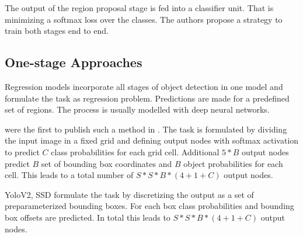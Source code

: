 	The output of the region proposal stage is fed into a classifier unit. That is minimizing a softmax loss over the classes. The authors propose a strategy to train both stages end to end.

	\subsection{One-stage Approaches}
	

	Regression models incorporate all stages of object detection in one model and formulate the task as regression problem. Predictions are made for a predefined set of regions. The process is usually modelled with deep neural networks.
	
	\citeauthor{Redmon} were the first to publish such a method in \cite{Redmon}. The task is formulated by dividing the input image in a fixed grid and defining output nodes with softmax activation to predict $C$ class probabilities for each grid cell. Additional $5*B$ output nodes predict $B$ set of bounding box coordinates and $B$ object probabilities for each cell. This leads to a total number of $S*S*B*(4 + 1 + C)$ output nodes. 
	
	YoloV2, SSD  formulate the task by discretizing the output as a set of preparameterized bounding boxes. For each box class probabilities and bounding box offsets are predicted. In total this leads to $S*S*B*(4 + 1 + C)$ output nodes. 
	
